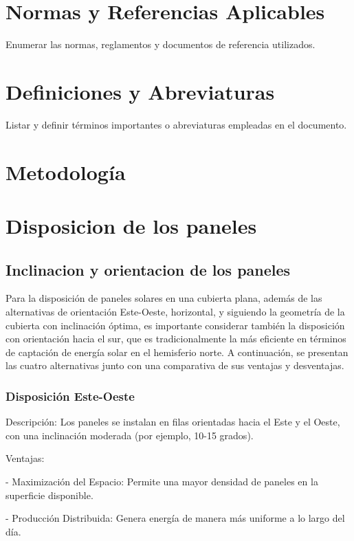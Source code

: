\documentclass[a4paper,12pt]{article}
\begin{document}
\begin{Form}
\section{Normas y Referencias Aplicables}
Enumerar las normas, reglamentos y documentos de referencia utilizados.

\section{Definiciones y Abreviaturas}
Listar y definir términos importantes o abreviaturas empleadas en el documento.

\section{Metodología}
\section{Disposicion de los paneles}


\subsection*{ Inclinacion  y orientacion de los paneles}


Para la disposición de paneles solares en una cubierta plana, además de las alternativas de orientación Este-Oeste, horizontal, y siguiendo la geometría de la cubierta con inclinación óptima, es importante considerar también la disposición con orientación hacia el sur, que es tradicionalmente la más eficiente en términos de captación de energía solar en el hemisferio norte. A continuación, se presentan las cuatro alternativas junto con una comparativa de sus ventajas y desventajas.

\subsubsection*{Disposición Este-Oeste}
Descripción:
Los paneles se instalan en filas orientadas hacia el Este y el Oeste, con una inclinación moderada (por ejemplo, 10-15 grados).

Ventajas:

    - Maximización del Espacio: Permite una mayor densidad de paneles en la superficie disponible.

    - Producción Distribuida: Genera energía de manera más uniforme a lo largo del día.


\end{Form}
\end{document}
